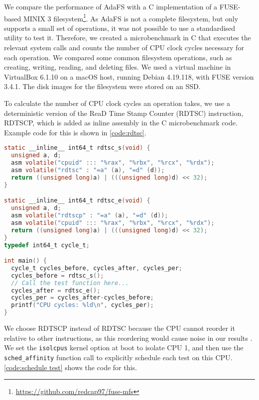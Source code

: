 We compare the performance of AdaFS with a C implementation of a FUSE-based MINIX 3 filesystem\footnote{\url{https://github.com/redcap97/fuse-mfs}}.
As AdaFS is not a complete filesystem, but only supports a small set of operations, it was not possible to use a standardised utility to test it.
Therefore, we created a microbenchmark in C that executes the relevant system calls and counts the number of CPU clock cycles necessary for each operation.
We compared some common filesystem operations, such as creating, writing, reading, and deleting files.
We used a virtual machine in VirtualBox 6.1.10 on a macOS host, running Debian 4.19.118, with FUSE version 3.4.1.
The disk images for the filesystem were stored on an SSD.

To calculate the number of CPU clock cycles an operation takes, we use a deterministic version of the ReaD Time Stamp Counter (RDTSC) instruction, RDTSCP, which is added as inline assembly in the C microbenchmark code.
Example code for this is shown in \autoref{code:rdtsc}.

\begin{lstlisting}[caption={Calculating clock cycles}, label={code:rdtsc}, language=C]
static __inline__ int64_t rdtsc_s(void) {
  unsigned a, d;
  asm volatile("cpuid" ::: "%rax", "%rbx", "%rcx", "%rdx");
  asm volatile("rdtsc" : "=a" (a), "=d" (d));
  return ((unsigned long)a) | (((unsigned long)d) << 32);
}

static __inline__ int64_t rdtsc_e(void) {
  unsigned a, d;
  asm volatile("rdtscp" : "=a" (a), "=d" (d));
  asm volatile("cpuid" ::: "%rax", "%rbx", "%rcx", "%rdx");
  return ((unsigned long)a) | (((unsigned long)d) << 32);
}
typedef int64_t cycle_t;

int main() {
  cycle_t cycles_before, cycles_after, cycles_per;
  cycles_before = rdtsc_s();
  // Call the test function here...
  cycles_after = rdtsc_e();
  cycles_per = cycles_after-cycles_before;
  printf("CPU cycles: %ld\n", cycles_per);
}
\end{lstlisting}

We choose RDTSCP instead of RDTSC because the CPU cannot reorder it relative to other instructions, as this reordering would cause noise in our results \cite{delorie2016}.
We set the \lstinline{isolcpus} kernel option at boot to isolate CPU 1, and then use the \lstinline{sched_affinity} function call to explicitly schedule each test on this CPU.
\autoref{code:schedule test} shows the code for this.

